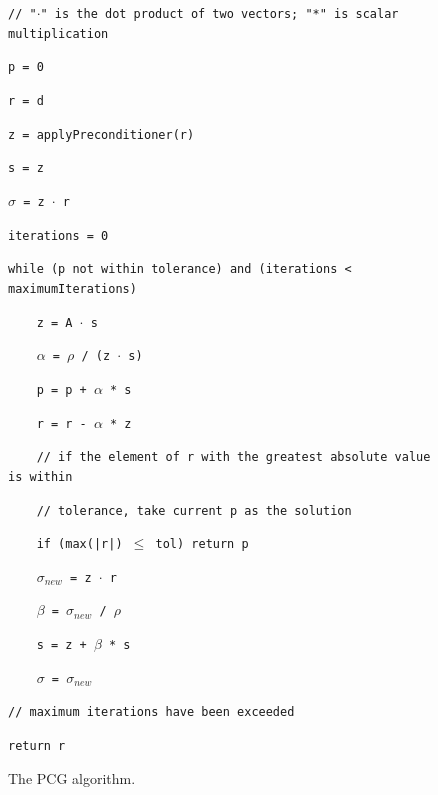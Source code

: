 \documentclass[12pt]{article}
\begin{document}
\begin{figure}[h]
\begin{framed}
\texttt{// "$\cdot$" is the dot product of two vectors; "*" is scalar multiplication}

\texttt{p = 0}

\texttt{r = d}

\texttt{z = applyPreconditioner(r)}

\texttt{s = z}

\texttt{$\sigma$ = z $\cdot$ r}

\texttt{iterations = 0}

\texttt{while (p not within tolerance) and (iterations < maximumIterations)}

\texttt{~~~~z = A $\cdot$ s}

\texttt{~~~~$\alpha$ = $\rho$ / (z $\cdot$ s)}

\texttt{~~~~p = p + $\alpha$ * s}

\texttt{~~~~r = r - $\alpha$ * z}

\texttt{~~~~// if the element of r with the greatest absolute value is within}

\texttt{~~~~// tolerance, take current p as the solution}

\texttt{~~~~if (max(|r|) $\leq$ tol) return p}

\texttt{~~~~$\sigma_{new}$ = z $\cdot$ r}

\texttt{~~~~$\beta$ = $\sigma_{new}$ / $\rho$}

\texttt{~~~~s = z + $\beta$ * s}

\texttt{~~~~$\sigma$ = $\sigma_{new}$}

\texttt{// maximum iterations have been exceeded}

\texttt{return r} 

\end{framed}
\vspace*{-3mm}\caption{The PCG algorithm.}
\label{fig:PCG}
\end{figure}
\end{document}
